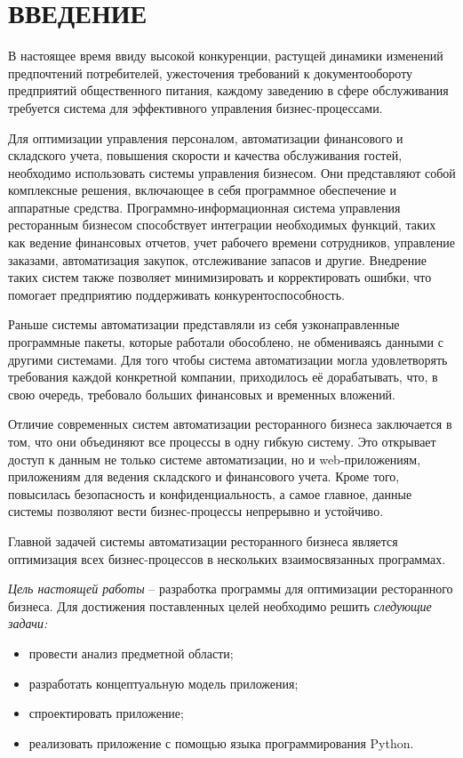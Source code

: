 \section*{ВВЕДЕНИЕ}

В настоящее время ввиду высокой конкуренции, растущей динамики изменений предпочтений потребителей, ужесточения требований к документообороту предприятий общественного питания, каждому заведению в сфере обслуживания требуется система для эффективного управления бизнес-процессами.  

Для оптимизации управления персоналом, автоматизации финансового и складского учета, повышения скорости и качества обслуживания гостей, необходимо использовать системы управления бизнесом. Они представляют собой комплексные решения, включающее в себя программное обеспечение и аппаратные средства. Программно-информационная система управления ресторанным бизнесом способствует интеграции необходимых функций, таких как ведение финансовых отчетов, учет рабочего времени сотрудников, управление заказами, автоматизация закупок, отслеживание запасов и другие. Внедрение таких систем также позволяет минимизировать и корректировать ошибки, что помогает предприятию поддерживать конкурентоспособность.  

Раньше системы автоматизации представляли из себя узконаправленные программные пакеты, которые работали обособлено, не обмениваясь данными с другими системами. Для того чтобы система автоматизации могла удовлетворять требования каждой конкретной компании, приходилось её дорабатывать, что, в свою очередь, требовало больших финансовых и временных вложений. 

Отличие современных систем автоматизации ресторанного бизнеса заключается в том, что они объединяют все процессы в одну гибкую систему. Это открывает доступ к данным не только системе автоматизации, но и web-приложениям, приложениям для ведения складского и финансового учета. Кроме того, повысилась безопасность и конфиденциальность, а самое главное, данные системы позволяют вести бизнес-процессы непрерывно и устойчиво. 

Главной задачей системы автоматизации ресторанного бизнеса является оптимизация всех бизнес-процессов в нескольких взаимосвязанных программах.   

\emph{Цель настоящей работы} – разработка программы для оптимизации ресторанного бизнеса.  Для достижения поставленных целей необходимо решить \emph{следующие задачи:}
\begin{itemize}
\item провести анализ предметной области;
\item разработать концептуальную модель приложения;
\item спроектировать приложение;
\item реализовать приложение с помощью языка программирования Python.
\end{itemize}


